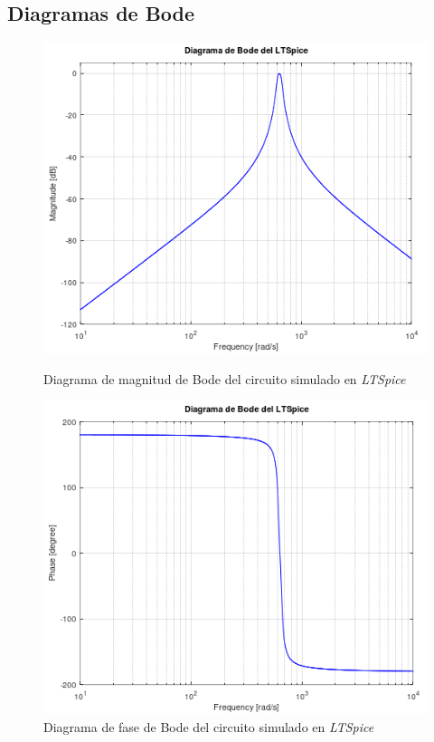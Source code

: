 \documentclass[11pt,a4paper]{report}
\begin{document}
\newpage
\subsection*{Diagramas de Bode}

\begin{figure}[h!]
\centering
\includegraphics[scale=0.9]{MagnitudBodeSpice.png}
\caption{Diagrama de magnitud de Bode del circuito simulado en \textit{LTSpice}}
\vspace{2 mm}
\includegraphics[scale=0.85]{PhaseBodeSpice.png}
\caption{Diagrama de fase de Bode del circuito simulado en \textit{LTSpice}}
\end{figure}
\end{document}
